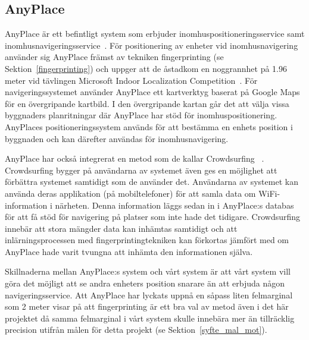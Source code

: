 \documentclass[a4paper,12pt]{article}
\begin{document}
 \subsection{AnyPlace}
 AnyPlace är ett befintligt system som erbjuder inomhuspositioneringsservice samt inomhusnavigeringsservice~\cite{anyplace}. För positionering av enheter vid inomhusnavigering använder sig AnyPlace främst av tekniken fingerprinting (se Sektion~\ref{fingerprinting}) och uppger att de åstadkom en noggrannhet på 1.96 meter vid tävlingen Microsoft Indoor Localization Competition~\cite{IPS_tavling}.
 För navigeringssystemet använder AnyPlace ett kartverktyg baserat på Google Maps för en övergripande kartbild. I den övergripande kartan går det att välja vissa byggnaders planritningar där AnyPlace har stöd för inomhuspositionering. AnyPlaces positioneringssystem används för att bestämma en enhets position i byggnaden och kan därefter användas för inomhusnavigering.

 AnyPlace har också integrerat en metod som de kallar Crowdsurfing ~\cite{anyplace}. Crowdsurfing bygger på användarna av systemet även ges en möjlighet att förbättra systemet samtidigt som de använder det. Användarna av systemet kan använda deras applikation (på mobiltelefoner) för att samla data om WiFi-information i närheten. Denna information läggs sedan in i AnyPlace:s databas för att få stöd för navigering på platser som inte hade det tidigare. Crowdsurfing innebär att stora mängder data kan inhämtas samtidigt och att inlärningsprocessen med fingerprintingtekniken kan förkortas jämfört med om AnyPlace hade varit tvungna att inhämta den informationen själva.

 Skillnaderna mellan AnyPlace:s system och vårt system är att vårt system vill göra det möjligt att se andra enheters position snarare än att erbjuda någon navigeringsservice. Att AnyPlace har lyckats uppnå en såpass liten felmarginal som 2 meter visar på att fingerprinting är ett bra val av metod även i det här projektet då samma felmarginal i vårt system skulle innebära mer än tillräcklig precision utifrån målen för detta projekt (se Sektion~\ref{syfte_mal_mot}).

\end{document}
